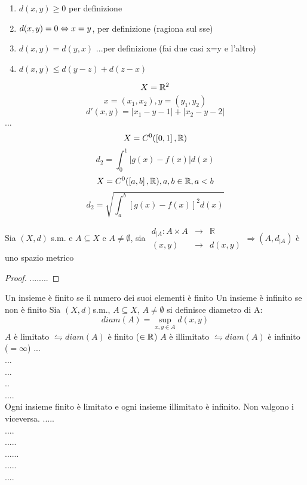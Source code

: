 	\begin{enumerate}
		\item $d(x,y)\ge 0$ per definizione
		\item $d(x,y)=0\Leftrightarrow x=y$, per definizione (ragiona sul sse) 
		\item $d(x,y)=d(y,x)$ ...per definizione (fai due casi x=y e l'altro)
		\item $d(x,y)\le d(y-z)+d(z-x)$ 
	\end{enumerate}
\example
$$X=\mathbb{R}^{2}$$
$$x=(x_1,x_2), y=(y_1,y_2)$$
$$d'(x,y)=\left| x_1-y-1 \right|+\left|x_2-y-2\right|$$
...\\

\example
\example
$$X=C^0(\left[0,1\right],\mathbb{R})$$
$$d_2=\int_0^1\left|g(x)-f(x)\right|d(x)$$
\example
$$X=C^0(\left[a,b\right],\mathbb{R}), a,b\in\mathbb{R}, a<b$$
$$d_2=\sqrt{\int_a^b\left[g(x)-f(x)\right]^2d(x)}$$

\proposition
Sia $(X,d)$ s.m. e $A\subseteq X$ e $A\ne \emptyset$, sia $\begin{array}{rcl} d_{|A} : A\times A & \to & \mathbb{R} \\ (x,y) & \to & d(x,y) \end{array} \Rightarrow (A,d_{|A})$ è uno spazio metrico
\begin{proof}
	........
\end{proof}

Un insieme è finito se il numero dei suoi elementi è finito
Un insieme è infinito se non è finito
Sia $(X,d)$s.m., $A\subseteq X$, $A\ne \emptyset$ si definisce diametro di A: $$diam(A)=\sup\limits_{x,y\in A}d(x,y)$$
$A$ è limitato $\leftrightharpoons diam(A)$ è finito ($\in\mathbb{R}$)
$A$ è illimitato $\leftrightharpoons diam(A)$ è infinito ($=\infty$)
\example
...\\
...\\
...\\
..\\
....\\
\observation
Ogni insieme finito è limitato e ogni insieme illimitato è infinito. Non valgono i viceversa.
\example 
.....\\
....\\
.....\\
......\\
.....\\
....\\

